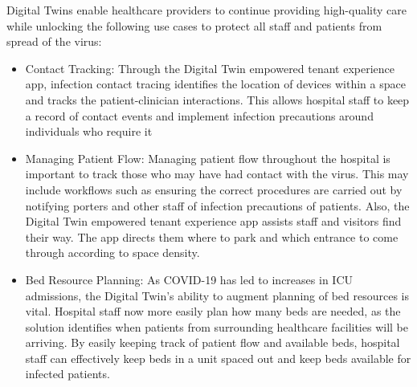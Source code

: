 \documentclass[12pt]{article}
\begin{document}
Digital Twins enable healthcare providers to continue providing high-quality care while unlocking the following use cases to protect all staff and patients from spread of the virus: 
\begin{itemize}
\item Contact Tracking: Through the Digital Twin empowered tenant experience app, infection contact tracing identifies the location of devices within a space and tracks the patient-clinician interactions. This allows hospital staff to keep a record of contact events and implement infection precautions around individuals who require it

\item Managing Patient Flow: Managing patient flow throughout the hospital is important to track those who may have had contact with the virus. This may include workflows such as ensuring the correct procedures are carried out by notifying porters and other staff of infection precautions of patients. Also, the Digital Twin empowered tenant experience app assists staff and visitors find their way. The app directs them where to park and which entrance to come through according to space density. 





\item  Bed Resource Planning: As COVID-19 has led to increases in ICU admissions, the Digital Twin’s ability to augment planning of bed resources is vital. Hospital staff now more easily plan how many beds are needed, as the solution identifies when patients from surrounding healthcare facilities will be arriving. By easily keeping track of patient flow and available beds, hospital staff can effectively keep beds in a unit spaced out and keep beds available for infected patients. 
\end{itemize}
\end{document}
